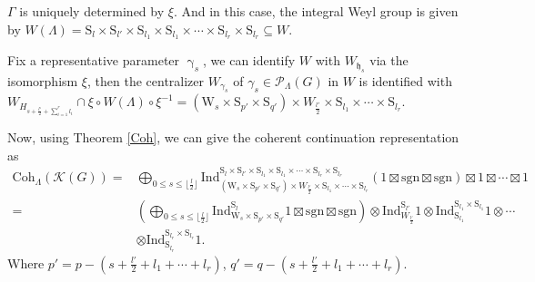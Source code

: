 \documentclass[12pt, a4paper]{amsart}
\numberwithin{equation}{section}
\newcommand{\CK}{{\mathcal {K}}}
\newcommand{\CP}{{\mathcal {P}}}
\newcommand{\fh}{\mathfrak{h}}
\newcommand{\Ind}{{\mathrm{Ind}}}
\newcommand{\sgn}{{\mathrm{sgn}}}
\begin{document}
$\Gamma$ is uniquely determined by $\xi$. And in this case, the integral Weyl group is given by $W(\Lambda) = \mathrm{S}_{l} \times \mathrm{S}_{l'} \times \mathrm{S}_{l_1} \times \mathrm{S}_{l_1} \times \cdots \times \mathrm{S}_{l_r} \times \mathrm{S}_{l_r} \subseteq W$.

Fix a representative parameter $\upgamma_s$, we can identify $W$ with $W_{\fh_s}$ via the isomorphism $\xi$, then the centralizer $W_{{\gamma_{s}}}$ of ${\gamma_{s}} \in \CP_{\Lambda}(G)$ in $W$ is identified with $W_{H_{s + \frac{l'}{2} + \sum_{i=1}^{r} l_i}} \cap \xi \circ W(\Lambda) \circ \xi^{-1} = (\mathrm{W}_{s} \times \mathrm{S}_{p'} \times \mathrm{S}_{q'}) \times W_{\frac{l'}{2}} \times \mathrm{S}_{l_1} \times \cdots \times \mathrm{S}_{l_r}$.

Now, using Theorem \ref{Coh}, we can give the coherent continuation representation as
\begin{align*}
    \mathrm{Coh}_{\Lambda}(\CK(G))  = &\bigoplus_{0 \leq s \leq \lfloor\frac{l}{2}\rfloor} \Ind _{(\mathrm{W}_{s} \times \mathrm{S}_{p'} \times \mathrm{S}_{q'}) \times W_{\frac{l'}{2}} \times \mathrm{S}_{l_1} \times \cdots \times \mathrm{S}_{l_r}}^{\mathrm{S}_{l} \times \mathrm{S}_{l'} \times \mathrm{S}_{l_1} \times \mathrm{S}_{l_1} \times \cdots \times \mathrm{S}_{l_r} \times \mathrm{S}_{l_r}} (1 \boxtimes \sgn \boxtimes \sgn) \boxtimes 1 \boxtimes \cdots \boxtimes 1 \\
    = &(\bigoplus_{0 \leq s \leq \lfloor\frac{l}{2}\rfloor}\Ind _{\mathrm{W}_{s} \times \mathrm{S}_{p'} \times \mathrm{S}_{q'}}^{\mathrm{S}_{l}}1 \boxtimes \sgn \boxtimes \sgn ) \otimes \Ind_{W_{\frac{l'}{2}}}^{\mathrm{S}_{l'}} 1 \otimes \Ind_{\mathrm{S}_{l_1}}^{\mathrm{S}_{l_1}\times \mathrm{S}_{l_1}}1 \otimes \cdots \\
    & \otimes \Ind_{\mathrm{S}_{l_r}}^{\mathrm{S}_{l_r}\times \mathrm{S}_{l_r}}1.
\end{align*}
Where $p' = p - (s + \frac{l'}{2} + l_1 + \cdots + l_r) $, $q' = q - (s + \frac{l'}{2} + l_1 + \cdots + l_r)$.
\end{document}
